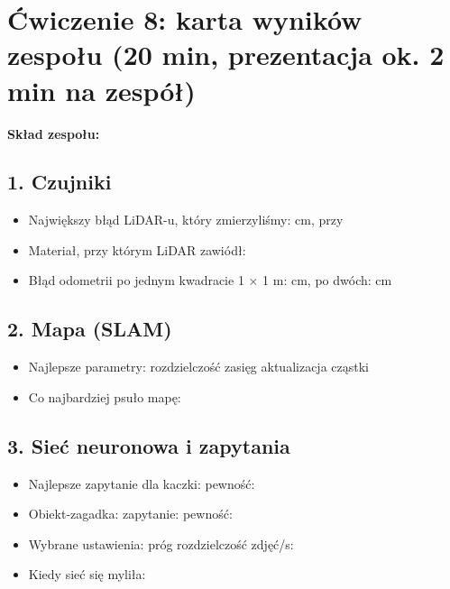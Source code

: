 \section{Ćwiczenie 8: karta wyników zespołu (20 min, prezentacja ok. 2 min na zespół)}\label{ux107wiczenie-8-karta-wynikuxf3w-zespoux142u-20-min-prezentacja-ok.-2-min-na-zespuxf3ux142}

\textbf{Skład zespołu:} 

\subsection{1. Czujniki}\label{czujniki}

\begin{itemize}
\tightlist
\item
  Największy błąd LiDAR-u, który zmierzyliśmy:  cm, przy 
\item
  Materiał, przy którym LiDAR zawiódł: 
\item
  Błąd odometrii po jednym kwadracie 1 × 1 m:  cm, po dwóch:  cm
\end{itemize}

\subsection{2. Mapa (SLAM)}\label{mapa-slam}

\begin{itemize}
\tightlist
\item
  Najlepsze parametry: rozdzielczość  zasięg  aktualizacja  cząstki 
\item
  Co najbardziej psuło mapę: 
\end{itemize}

\szkicmapy

\subsection{3. Sieć neuronowa i zapytania}\label{sieux107-neuronowa-i-zapytania}

\begin{itemize}
\tightlist
\item
  Najlepsze zapytanie dla kaczki:  pewność: 
\item
  Obiekt-zagadka:  zapytanie:  pewność: 
\item
  Wybrane ustawienia: próg  rozdzielczość  zdjęć/s: 
\item
  Kiedy sieć się myliła: 
\end{itemize}

